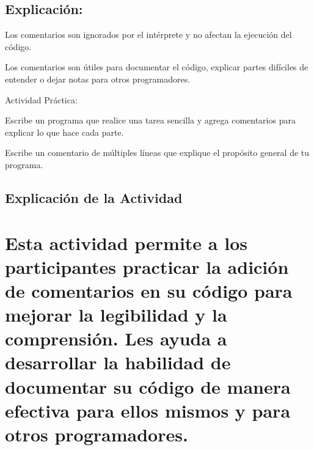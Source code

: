 \documentclass[
  a4paper,
  onepage,
  openany]{scrreprt}
\begin{document}
\hypertarget{explicaciuxf3n-8}{%
\section{Explicación:}\label{explicaciuxf3n-8}}

Los comentarios son ignorados por el intérprete y no afectan la
ejecución del código.

Los comentarios son útiles para documentar el código, explicar partes
difíciles de entender o dejar notas para otros programadores.

\begin{tcolorbox}[enhanced jigsaw, breakable, opacityback=0, toptitle=1mm, coltitle=black, toprule=.15mm, rightrule=.15mm, colframe=quarto-callout-important-color-frame, opacitybacktitle=0.6, arc=.35mm, title=\textcolor{quarto-callout-important-color}{\faExclamation}\hspace{0.5em}{Importante}, titlerule=0mm, colbacktitle=quarto-callout-important-color!10!white, bottomtitle=1mm, bottomrule=.15mm, colback=white, left=2mm, leftrule=.75mm]

Actividad Práctica:

Escribe un programa que realice una tarea sencilla y agrega comentarios
para explicar lo que hace cada parte.

Escribe un comentario de múltiples líneas que explique el propósito
general de tu programa.

\end{tcolorbox}

\hypertarget{explicaciuxf3n-de-la-actividad-6}{%
\section{Explicación de la
Actividad}\label{explicaciuxf3n-de-la-actividad-6}}

\hypertarget{esta-actividad-permite-a-los-participantes-practicar-la-adiciuxf3n-de-comentarios-en-su-cuxf3digo-para-mejorar-la-legibilidad-y-la-comprensiuxf3n.-les-ayuda-a-desarrollar-la-habilidad-de-documentar-su-cuxf3digo-de-manera-efectiva-para-ellos-mismos-y-para-otros-programadores.}{%
\chapter{Esta actividad permite a los participantes practicar la adición
de comentarios en su código para mejorar la legibilidad y la
comprensión. Les ayuda a desarrollar la habilidad de documentar su
código de manera efectiva para ellos mismos y para otros
programadores.}\label{esta-actividad-permite-a-los-participantes-practicar-la-adiciuxf3n-de-comentarios-en-su-cuxf3digo-para-mejorar-la-legibilidad-y-la-comprensiuxf3n.-les-ayuda-a-desarrollar-la-habilidad-de-documentar-su-cuxf3digo-de-manera-efectiva-para-ellos-mismos-y-para-otros-programadores.}}
\end{document}
